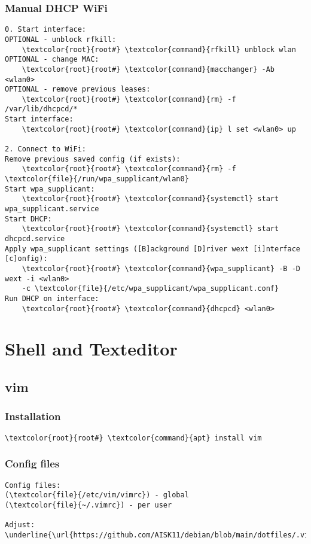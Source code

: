 \documentclass[10pt, a4paper, onecolumn, openany]{book} %
\begin{document}
\subsection{Manual DHCP WiFi}
\begin{Verbatim}[commandchars=\\\{\}]
0. Start interface:
OPTIONAL - unblock rfkill:
    \textcolor{root}{root#} \textcolor{command}{rfkill} unblock wlan
OPTIONAL - change MAC:
    \textcolor{root}{root#} \textcolor{command}{macchanger} -Ab <wlan0>
OPTIONAL - remove previous leases:
    \textcolor{root}{root#} \textcolor{command}{rm} -f /var/lib/dhcpcd/*
Start interface:
    \textcolor{root}{root#} \textcolor{command}{ip} l set <wlan0> up

2. Connect to WiFi:
Remove previous saved config (if exists):
    \textcolor{root}{root#} \textcolor{command}{rm} -f \textcolor{file}{/run/wpa_supplicant/wlan0}
Start wpa_supplicant:
    \textcolor{root}{root#} \textcolor{command}{systemctl} start wpa_supplicant.service
Start DHCP:
    \textcolor{root}{root#} \textcolor{command}{systemctl} start dhcpcd.service
Apply wpa_supplicant settings ([B]ackground [D]river wext [i]nterface [c]onfig):
    \textcolor{root}{root#} \textcolor{command}{wpa_supplicant} -B -D wext -i <wlan0>
    -c \textcolor{file}{/etc/wpa_supplicant/wpa_supplicant.conf}
Run DHCP on interface:
    \textcolor{root}{root#} \textcolor{command}{dhcpcd} <wlan0>
\end{Verbatim}



\chapter{Shell and Texteditor}
\section{vim}
\subsection{Installation}
\begin{Verbatim}[commandchars=\\\{\}]
    \textcolor{root}{root#} \textcolor{command}{apt} install vim
\end{Verbatim}
\subsection{Config files}
\begin{Verbatim}[commandchars=\\\{\}]
Config files:
(\textcolor{file}{/etc/vim/vimrc}) - global
(\textcolor{file}{~/.vimrc}) - per user

Adjust:
\underline{\url{https://github.com/AISK11/debian/blob/main/dotfiles/.vimrc}}
\end{Verbatim}
\end{document}
